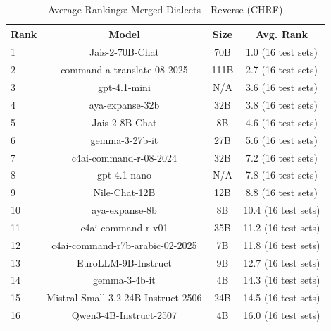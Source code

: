 \begin{table}[htbp]
\centering
\caption{Average Rankings: Merged Dialects - Reverse (CHRF)}
\label{tab:avg_rankings_chrf}
\begin{tabular}{l@{\hspace{3pt}}c@{\hspace{3pt}}c@{\hspace{3pt}}c}
\toprule
Rank & Model & Size & Avg. Rank \\
\midrule
1 & Jais-2-70B-Chat & 70B & 1.0 (16 test sets) \\
2 & command-a-translate-08-2025 & 111B & 2.7 (16 test sets) \\
3 & gpt-4.1-mini & N/A & 3.6 (16 test sets) \\
4 & aya-expanse-32b & 32B & 3.8 (16 test sets) \\
5 & Jais-2-8B-Chat & 8B & 4.6 (16 test sets) \\
6 & gemma-3-27b-it & 27B & 5.6 (16 test sets) \\
7 & c4ai-command-r-08-2024 & 32B & 7.2 (16 test sets) \\
8 & gpt-4.1-nano & N/A & 7.8 (16 test sets) \\
9 & Nile-Chat-12B & 12B & 8.8 (16 test sets) \\
10 & aya-expanse-8b & 8B & 10.4 (16 test sets) \\
11 & c4ai-command-r-v01 & 35B & 11.2 (16 test sets) \\
12 & c4ai-command-r7b-arabic-02-2025 & 7B & 11.8 (16 test sets) \\
13 & EuroLLM-9B-Instruct & 9B & 12.7 (16 test sets) \\
14 & gemma-3-4b-it & 4B & 14.3 (16 test sets) \\
15 & Mistral-Small-3.2-24B-Instruct-2506 & 24B & 14.5 (16 test sets) \\
16 & Qwen3-4B-Instruct-2507 & 4B & 16.0 (16 test sets) \\
\bottomrule
\end{tabular}
\end{table}